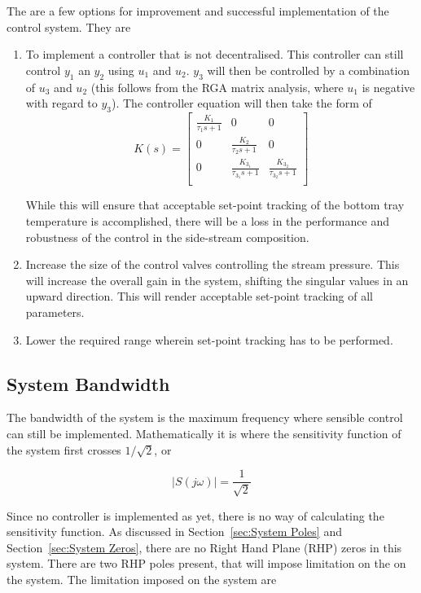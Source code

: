 The are a few options for improvement and successful implementation of the control system. They are

\begin{enumerate}
	\item To implement a controller that is not decentralised. This controller can still control $y_1$ an $y_2$ using $u_1$ and $u_2$. $y_3$ will then be controlled by a combination of $u_3$ and $u_2$ (this follows from the RGA matrix analysis, where $u_1$ is negative with regard to $y_3$). The controller equation will then take the form of
	\begin{equation}
		K(s) = \begin{bmatrix}
		\frac{K_1}{\tau_1s + 1} & 0 & 0\\
		0 &\frac{K_2}{\tau_2s + 1} & 0\\
		0 & \frac{K_{3_1}}{\tau_{3_1}s + 1} & \frac{K_{3_2}}{\tau_{3_2}s + 1}\\
		\end{bmatrix}
	\end{equation}
	
	While this will ensure that acceptable set-point tracking of the bottom tray temperature is accomplished, there will be a loss in the performance and robustness of the control in the side-stream composition.
	
	\item Increase the size of the control valves controlling the stream pressure. This will increase the overall gain in the system, shifting the singular values in an upward direction. This will render acceptable set-point tracking of all parameters.
	
	\item Lower the required range wherein set-point tracking has to be performed. 
\end{enumerate}

\subsection{System Bandwidth}

The bandwidth of the system is the maximum frequency where sensible control can still be implemented. Mathematically it is where the sensitivity function of the system first crosses $1/\sqrt{2}$, or

\begin{equation}
	|S(j\omega)| = \frac{1}{\sqrt{2}}
\end{equation}

Since no controller is implemented as yet, there is no way of calculating the sensitivity function. As discussed in Section~\ref{sec:System Poles} and Section~\ref{sec:System Zeros}, there are no Right Hand Plane (RHP) zeros in this system. There are two RHP poles present, that will impose limitation on the on the system. The limitation imposed on the system are

